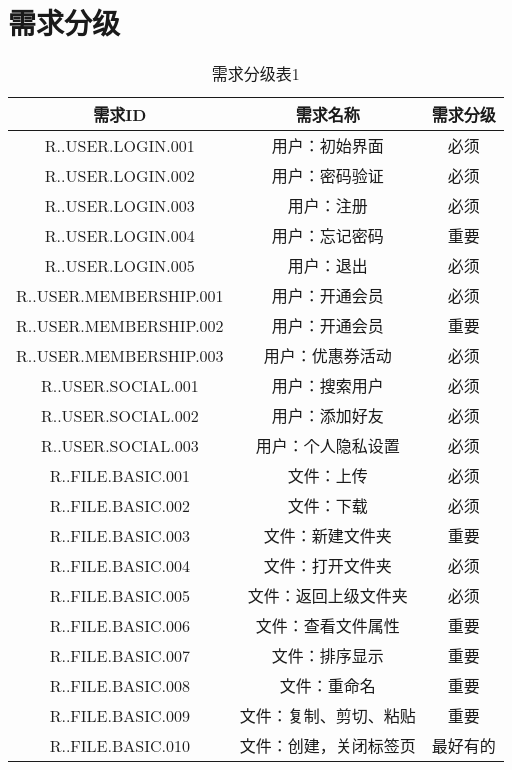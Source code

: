 \chapter{需求分级}
\begin{table}[htbp]
    \color{red}
\centering
\caption{需求分级表1} \label{tab:abbr}
\begin{tabular}{|c|c|c|}
    \hline
    需求ID & 需求名称 & 需求分级 \\
    \hline
    R..USER.LOGIN.001 & 用户：初始界面 & 必须 \\
    \hline
    R..USER.LOGIN.002 & 用户：密码验证 & 必须 \\
    \hline 
    R..USER.LOGIN.003 & 用户：注册 & 必须 \\
    \hline
    R..USER.LOGIN.004 & 用户：忘记密码 & 重要 \\
    \hline
    R..USER.LOGIN.005 & 用户：退出 & 必须 \\
    \hline
    R..USER.MEMBERSHIP.001 & 用户：开通会员 & 必须 \\
    \hline
    R..USER.MEMBERSHIP.002 & 用户：开通会员 & 重要 \\
    \hline
    R..USER.MEMBERSHIP.003 & 用户：优惠券活动 & 必须 \\
    \hline
    R..USER.SOCIAL.001 & 用户：搜索用户 & 必须 \\
    \hline
    R..USER.SOCIAL.002 & 用户：添加好友 & 必须 \\
    \hline
    R..USER.SOCIAL.003 & 用户：个人隐私设置 & 必须 \\
    \hline
    R..FILE.BASIC.001 & 文件：上传 & 必须 \\
    \hline
    R..FILE.BASIC.002 & 文件：下载 & 必须 \\
    \hline 
    R..FILE.BASIC.003 & 文件：新建文件夹 & 重要 \\
    \hline
    R..FILE.BASIC.004 & 文件：打开文件夹 & 必须 \\
    \hline
    R..FILE.BASIC.005 & 文件：返回上级文件夹 & 必须 \\
    \hline
    R..FILE.BASIC.006 & 文件：查看文件属性 & 重要 \\
    \hline
    R..FILE.BASIC.007 & 文件：排序显示 & 重要 \\
    \hline
    R..FILE.BASIC.008 & 文件：重命名 & 重要 \\
    \hline
    R..FILE.BASIC.009 & 文件：复制、剪切、粘贴 & 重要 \\
    \hline
    R..FILE.BASIC.010 & 文件：创建，关闭标签页 & 最好有的 \\
    \hline

\end{tabular}
\end{table}
